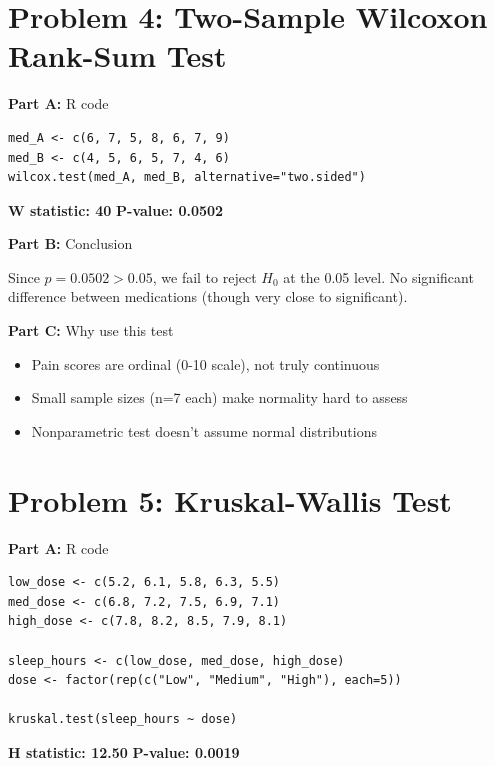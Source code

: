 \documentclass[11pt]{article}
\begin{document}
\newpage

\section{Problem 4: Two-Sample Wilcoxon Rank-Sum Test}

\textbf{Part A:} R code

\begin{lstlisting}
med_A <- c(6, 7, 5, 8, 6, 7, 9)
med_B <- c(4, 5, 6, 5, 7, 4, 6)
wilcox.test(med_A, med_B, alternative="two.sided")
\end{lstlisting}

\textbf{W statistic: 40} \quad \textbf{P-value: 0.0502}

\vspace{6pt}

\textbf{Part B:} Conclusion

Since $p = 0.0502 > 0.05$, we fail to reject $H_0$ at the 0.05 level. No significant difference between medications (though very close to significant).

\vspace{6pt}

\textbf{Part C:} Why use this test

\begin{itemize}
\item Pain scores are ordinal (0-10 scale), not truly continuous
\item Small sample sizes (n=7 each) make normality hard to assess
\item Nonparametric test doesn't assume normal distributions
\end{itemize}

\newpage

\section{Problem 5: Kruskal-Wallis Test}

\textbf{Part A:} R code

\begin{lstlisting}
low_dose <- c(5.2, 6.1, 5.8, 6.3, 5.5)
med_dose <- c(6.8, 7.2, 7.5, 6.9, 7.1)
high_dose <- c(7.8, 8.2, 8.5, 7.9, 8.1)

sleep_hours <- c(low_dose, med_dose, high_dose)
dose <- factor(rep(c("Low", "Medium", "High"), each=5))

kruskal.test(sleep_hours ~ dose)
\end{lstlisting}

\textbf{H statistic: 12.50} \quad \textbf{P-value: 0.0019}
\end{document}
